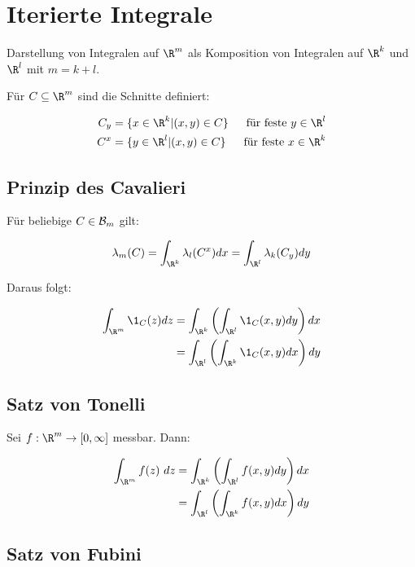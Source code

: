 \section*{Iterierte Integrale}

Darstellung von Integralen auf $\R^m$ als Komposition von Integralen auf $\R^k$ und $\R^l$ mit $m = k + l$.

Für $C \subseteq \R^m$ sind die Schnitte definiert:

\vspace{-4mm}
\begin{align*}
	C_y &= \{ x \in \R^k | (x,y) \in C \} &\text{ für feste } y \in \R^l\\
	C^x &= \{ y \in \R^l | (x,y) \in C \} &\text{ für feste } x \in \R^k
\end{align*}

\subsection*{Prinzip des Cavalieri}

Für beliebige $C \in \mathcal{B}_m$ gilt:

$$\lambda_m(C) = \int_{\R^k} \lambda_l(C^x) dx = \int_{\R^l} \lambda_k(C_y) dy$$

Daraus folgt:

\vspace{-4mm}
\begin{align*}
\int_{\R^m} \1_C(z) dz &= \int_{\R^k} \left( \int_{\R^l} \1_C(x,y) dy \right) dx\\
                         &= \int_{\R^l} \left( \int_{\R^k} \1_C(x,y) dx \right) dy
\end{align*}

\subsection*{Satz von Tonelli}

Sei $f : \R^m \to [0,\infty]$ messbar. Dann:

\vspace{-4mm}
\begin{align*}
	\int_{\R^m} f(z) \ dz &= \int_{\R^k} \left( \int_{\R^l} f(x,y) dy \right) dx\\
	               &= \int_{\R^l} \left( \int_{\R^k} f(x,y) dx \right) dy
\end{align*}

\subsection*{Satz von Fubini}

